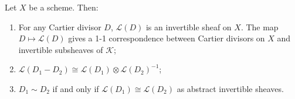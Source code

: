 Let $X$ be a scheme. Then:
\begin{enumerate}
\item[(a)] For any Cartier divisor $D$, $\mathcal{L}(D)$ is an invertible sheaf on $X$. The map $D \mapsto \mathcal{L}(D)$ gives a 1-1 correspondence between Cartier divisors on $X$ and invertible subsheaves of $\mathcal{K}$;
\item[(b)] $\mathcal{L}(D_1 - D_2) \cong \mathcal{L}(D_1) \otimes \mathcal{L}(D_2)^{-1}$;
\item[(c)] $D_1 \sim D_2$ if and only if $\mathcal{L}(D_1) \cong \mathcal{L}(D_2)$ as abstract invertible sheaves.
\end{enumerate}
